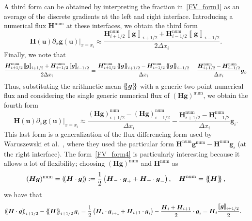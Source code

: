 \documentclass[]{scrartcl}
\newcommand*{\ldblbrace}{\{\mskip-5mu \left \{}
\newcommand*{\rdblbrace}{ \}\mskip-5mu \right \}}
\newcommand{\mean}[1]{\left\ldblbrace #1 \right\rdblbrace}
\newcommand*{\ldblparen}{(\mskip-3mu \left (}
\newcommand*{\rdblparen}{ )\mskip-3mu \right )}
\newcommand{\prodmean}[1]{\left\ldblparen #1 \right\rdblparen}
\renewcommand{\vec}[1]{\boldsymbol{#1}}
\newcommand{\jump}[1]{\left\llbracket #1  \right\rrbracket}
\theoremstyle{definition}
\begin{document}
A third form can be obtained by interpreting the fraction in~\eqref{FV_form1} as an average of the discrete gradients at the left and right interface. Introducing a numerical flux $\vec{H}^{\mathrm{num}}$ at these interfaces, we obtain the third form
\begin{equation}
\vec{H}(\vec{u}) \partial_x \vec{g}(\vec{u})\Big |_{x = x_i} \approx \frac{\vec{H}^{\mathrm{num}}_{i+1/2} \jump{\vec{g}}_{i+1/2} + \vec{H}^{\mathrm{num}}_{i-1/2} \jump{\vec{g}}_{i-1/2}}{2 \Delta x_i}.
\label{FV_form3}
\end{equation}
Finally, we note that
\begin{equation*}
\frac{\vec{H}^{\mathrm{num}}_{i+1/2} \jump{\vec{g}}_{i+1/2} + \vec{H}^{\mathrm{num}}_{i-1/2} \jump{\vec{g}}_{i-1/2}}{2 \Delta x_i}
=
\frac{\vec{H}^{\mathrm{num}}_{i+1/2} \mean{\vec{g}}_{i+1/2} - \vec{H}^{\mathrm{num}}_{i-1/2} \mean{\vec{g}}_{i-1/2}}{\Delta x_i}
- \frac{\vec{H}^{\mathrm{num}}_{i+1/2} - \vec{H}^{\mathrm{num}}_{i-1/2}}{\Delta x_i} \vec{g}_i.
\end{equation*}
Thus, substituting the arithmetic mean $\mean{\vec{g}}$ with a generic two-point numerical flux and considering the single generic numerical flux of $\left (\vec{H} \vec{g} \right )^{\mathrm{num}}$, we obtain the fourth form
\begin{equation}
\vec{H}(\vec{u}) \partial_x \vec{g}(\vec{u})\Big |_{x = x_i}
\approx
\frac{\left (\vec{H} \vec{g} \right ) ^{\mathrm{num}}_{i+1/2} - \left (\vec{H} \vec{g} \right ) ^{\mathrm{num}}_{i-1/2}}{\Delta x_i}
- \frac{\vec{H}^{\mathrm{num}}_{i+1/2} - \vec{H}^{\mathrm{num}}_{i-1/2}}{\Delta x_i} \vec{g}_i.
\label{FV_form4}
\end{equation}
This last form is a generalization of the flux differencing form used by Waruszewski et al.~\cite{WARUSZEWSKI2022111507}, where they used the particular form $\vec{H}^{\mathrm{num}} \vec{g}^{\mathrm{num}} - \vec{H}^{\mathrm{num}} \vec{g}_i$ (at the right interface).
The form~\eqref{FV_form4} is particularly interesting because it allows a lot of flexibility; choosing $(\vec{H} \vec{g})^{\mathrm{num}}$ and $\vec{H}^{\mathrm{num}}$ as
\begin{equation}
(\vec{H} \vec{g})^{\mathrm{num}} = \prodmean{\vec{H} \cdot \vec{g}} := \frac{1}{2} \left ( \vec{H}_- \cdot \vec{g}_+ + \vec{H}_+ \cdot \vec{g}_- \right ),
\quad \vec{H}^{\mathrm{num}} = \mean{\vec{H}},
\end{equation}
we have that
\begin{equation}
\begin{aligned}
    \prodmean{\vec{H} \cdot \vec{g}}_{i+1/2} - \mean{\vec{H}}_{i+1/2} \vec{g}_i
    &=
    \frac{1}{2} \left ( \vec{H}_i \cdot \vec{g}_{i+1} + \vec{H}_{i+1} \cdot \vec{g}_i \right ) - \frac{\vec{H}_i + \vec{H}_{i+1}}{2} \cdot \vec{g}_i
    = \vec{H}_i \frac{\jump{\vec{g}}_{i+1/2}}{2}.
\end{aligned}
\end{equation}
\end{document}
